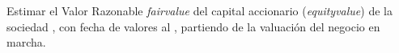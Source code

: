 Estimar el Valor Razonable \textit{\gls{fairvalue}}   del capital accionario (\textit{\gls{equityvalue}}) de la sociedad \textcolor{principal}{\empresaSolicitante}, con fecha de valores al \textcolor{principal}{\fechaValores}, partiendo de la valuaci\'on del negocio en marcha.